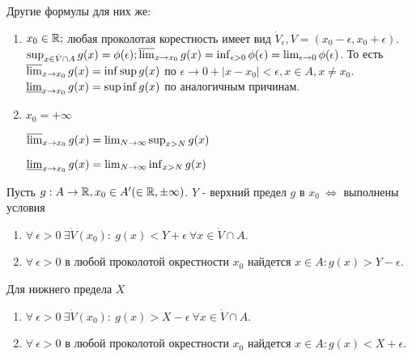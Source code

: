 \documentclass[12pt]{report}
\begin{document}
Другие формулы для них же:
\begin{enumerate}
\item $x_0 \in \mathbb{R};$ любая проколотая корестность имеет вид $\dot V_\epsilon, V = (x_0 - \epsilon, x_0 + \epsilon)$. $\sup_{x \in \dot V \cap A}{g(x)} = \phi(\epsilon); \varlimsup_{x \to x_0}{g(x)} = \inf_{\epsilon > 0}{\phi(\epsilon)} = \lim_{\epsilon \to 0}{\phi(\epsilon)}$. То есть $\varlimsup_{x \to x_0}{g(x)} = \inf{\sup{g(x)}}$ по $\epsilon \to 0 + |x - x_0| < \epsilon, x \in A, x \neq x_0$. $\varliminf_{x \to x_0}{g(x)} = \sup{\inf{g(x)}}$ по аналогичным причинам.
\item $x_0 = +\infty$

$\varlimsup_{x \to x_0}{g(x)} = \lim_{N \to \infty}{\sup_{x > N}{g(x)}}$

$\varliminf_{x \to x_0}{g(x)} = \lim_{N \to \infty}{\inf_{x > N}{g(x)}}$
\end{enumerate}

\begin{thm}
Пусть $g: A \to \mathbb{R}, x_0 \in A' (\in \mathbb{R}, \pm\infty)$. $Y$ - верхний предел $g$ в $x_0 ~\Leftrightarrow$ выполнены условия
\begin{enumerate}
\item $\forall ~\epsilon > 0 ~\exists \dot V(x_0): ~g(x) < Y + \epsilon ~\forall x \in \dot V \cap A$.
\item $\forall ~\epsilon > 0$ в любой проколотой окрестности $x_0$ найдется $x \in A: g(x) > Y - \epsilon$.
\end{enumerate}

Для нижнего предела $X$
\begin{enumerate}
\item $\forall ~\epsilon > 0 ~\exists \dot V(x_0): ~g(x) > X - \epsilon ~\forall x \in \dot V \cap A$.
\item $\forall ~\epsilon > 0$ в любой проколотой окрестности $x_0$ найдется $x \in A: g(x) < X + \epsilon$.
\end{enumerate}
\end{thm}
\end{document}
